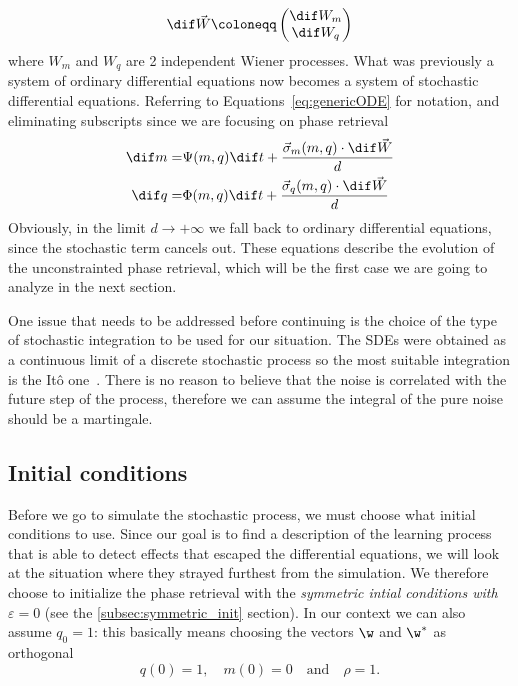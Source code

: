 \[
  \dif \vec{W} \coloneqq 
  \begin{pmatrix}
    \dif W_m \\
    \dif W_q
  \end{pmatrix}
\]
where \(W_m\) and \(W_q\) are 2 independent Wiener processes.
What was previously a system of ordinary differential equations now becomes a system of stochastic differential equations.
Referring to Equations~\eqref{eq:genericODE} for notation, and eliminating subscripts since we are focusing on phase retrieval
\begin{subequations}\label{eq:unconstrainted_phase_retrivial}\begin{align}
  \dif m =& \Psi{(m,q)}\dif t + \frac{\vec{\sigma}_m{(m,q)}\cdot\dif \vec{W}}{d} \\
  \dif q =& \Phi{(m,q)}\dif t + \frac{\vec{\sigma}_q{(m,q)}\cdot\dif \vec{W}}{d} 
\end{align}\end{subequations}
Obviously, in the limit \(d\to+\infty\) we fall back to ordinary differential equations,
since the stochastic term cancels out.
These equations describe the evolution of the unconstrainted phase retrieval,
which will be the first case we are going to analyze in the next section.

One issue that needs to be addressed before continuing is the choice of the type of stochastic integration to be used for our situation.
The SDEs were obtained as a continuous limit of a discrete stochastic process so the most suitable integration is the Itô one~\cite{smith2018ito}.
There is no reason to believe that the noise is correlated with the future step of the process, 
therefore we can assume the integral of the pure noise should be a martingale.

\subsection{Initial conditions}
Before we go to simulate the stochastic process, we must choose what initial conditions to use.
Since our goal is to find a description of the learning process that is able to detect effects that escaped the differential equations,
we will look at the situation where they strayed furthest from the simulation. 
We therefore choose to initialize the phase retrieval with the \emph{symmetric intial conditions with \(\varepsilon = 0\)} (see the \ref{subsec:symmetric_init} section).
In our context we can also assume \(q_0 = 1\): this basically means choosing the vectors \(\w\) and \(\w^*\) as orthogonal
\[
  q(0) = 1, \quad m(0) = 0 \quad\text{and}\quad\rho=1.
\]

